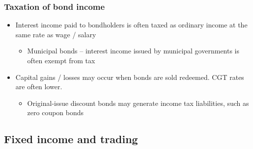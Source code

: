 \documentclass[../notes_compiled.tex]{subfiles}
\begin{document}
\subsubsection{Taxation of bond income}
\begin{itemize}
\item Interest income paid to bondholders is often taxed as ordinary income at the same rate as wage / salary
\begin{itemize}
\item Municipal bonds -- interest income issued by municipal governments is often exempt from tax
\end{itemize}
\item Capital gains / losses may occur when bonds are sold redeemed. CGT rates are often lower.
\begin{itemize}
\item Original-issue discount bonds may generate income tax liabilities, such as zero coupon bonds
\end{itemize}
\end{itemize}

\subsection{Fixed income and trading}
\end{document}
